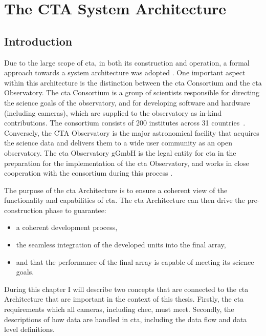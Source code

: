 \chapter{\label{ch3-architecture}The CTA System Architecture} 

\minitoc

\section{Introduction}

Due to the large scope of \gls{cta}, in both its construction and operation, a formal approach towards a system architecture was adopted \cite{Dazzi2018}. One important aspect within this architecture is the distinction between the \gls{cta} Consortium and the \gls{cta} Observatory. The \gls{cta} Consortium is a group of scientists responsible for directing the science goals of the observatory, and for developing software and hardware (including cameras), which are supplied to the observatory as in-kind contributions. The consortium consists of 200 institutes across 31 countries~\cite{cta-consortium}. Conversely, the CTA Observatory is the major astronomical facility that acquires the science data and delivers them to a wide user community as an open observatory. The \gls{cta} Observatory gGmbH is the legal entity for \gls{cta} in the preparation for the implementation of the \gls{cta} Observatory, and works in close cooperation with the consortium during this process \cite{cta-observatory}.

The purpose of the \gls{cta} Architecture is to ensure a coherent view of the functionality and capabilities of \gls{cta}. The \gls{cta} Architecture can then drive the pre-construction phase to guarantee:
\begin{itemize}
\item a coherent development process,
\item the seamless integration of the developed units into the final array,
\item and that the performance of the final array is capable of meeting its science goals.
\end{itemize}
During this chapter I will describe two concepts that are connected to the \gls{cta} Architecture that are important in the context of this thesis. Firstly, the \gls{cta} requirements which all cameras, including \gls{chec}, must meet. Secondly, the descriptions of how data are handled in \gls{cta}, including the data flow and data level definitions.


